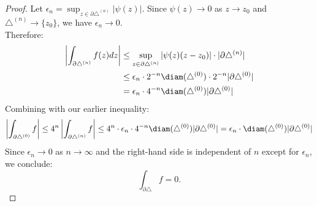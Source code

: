 \documentclass[a4paper]{article}
\begin{document}
\begin{proof}
    Let $\epsilon_n=\sup_{z\in\partial\triangle^{(n)}}|\psi(z)|$. Since $\psi(z)\to 0$ as $z\to z_0$ and $\triangle^{(n)}\to \{z_0\}$, we have $\epsilon_n\to 0$.\\
    Therefore:
    \begin{align*}
        \left | \int_{\partial \triangle^{(n)}}f(z)dz \right | &\leq \sup_{z\in\partial \triangle^{(n)}}|\psi(z)(z-z_0)| \cdot |\partial \triangle^{(n)}|\\
        &\leq \epsilon_n \cdot 2^{-n}\diam(\triangle^{(0)})\cdot 2^{-n}|\partial \triangle^{(0)}|\\
        &= \epsilon_n \cdot 4^{-n}\diam(\triangle^{(0)})|\partial \triangle^{(0)}|
    \end{align*}
    Combining with our earlier inequality:
    \[
    \left | \int_{\partial \triangle^{(0)}}f \right |\leq 4^n \left | \int_{\partial \triangle^{(n)}}f \right | \leq 4^n \cdot \epsilon_n \cdot 4^{-n}\diam(\triangle^{(0)})|\partial \triangle^{(0)}| = \epsilon_n \cdot \diam(\triangle^{(0)})|\partial \triangle^{(0)}|
    \]
    Since $\epsilon_n\to 0$ as $n\to\infty$ and the right-hand side is independent of $n$ except for $\epsilon_n$, we conclude:
    \[
    \int_{\partial \triangle}f=0
    .\]
\end{proof}
\end{document}
